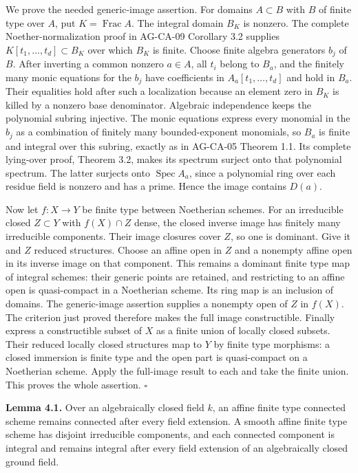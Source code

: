 \documentclass[11pt,a4paper,openany]{report}
\newcounter{none}
\begin{document}
We prove the needed generic-image assertion. For domains \(A\subset B\) with \(B\) of finite type over \(A\), put \(K=\operatorname{Frac}A\). The integral domain \(B_K\) is nonzero. The complete Noether-normalization proof in AG-CA-09 Corollary 3.2 supplies \(K[t_1,\ldots,t_d]\subset B_K\) over which \(B_K\) is finite. Choose finite algebra generators \(b_j\) of \(B\). After inverting a common nonzero \(a\in A\), all \(t_i\) belong to \(B_a\), and the finitely many monic equations for the \(b_j\) have coefficients in \(A_a[t_1,\ldots,t_d]\) and hold in \(B_a\). Their equalities hold after such a localization because an element zero in \(B_K\) is killed by a nonzero base denominator. Algebraic independence keeps the polynomial subring injective. The monic equations express every monomial in the \(b_j\) as a combination of finitely many bounded-exponent monomials, so \(B_a\) is finite and integral over this subring, exactly as in AG-CA-05 Theorem 1.1. Its complete lying-over proof, Theorem 3.2, makes its spectrum surject onto that polynomial spectrum. The latter surjects onto \(\operatorname{Spec}A_a\), since a polynomial ring over each residue field is nonzero and has a prime. Hence the image contains \(D(a)\).

Now let \(f:X\to Y\) be finite type between Noetherian schemes. For an irreducible closed \(Z\subset Y\) with \(f(X)\cap Z\) dense, the closed inverse image has finitely many irreducible components. Their image closures cover \(Z\), so one is dominant. Give it and \(Z\) reduced structures. Choose an affine open in \(Z\) and a nonempty affine open in its inverse image on that component. This remains a dominant finite type map of integral schemes: their generic points are retained, and restricting to an affine open is quasi-compact in a Noetherian scheme. Its ring map is an inclusion of domains. The generic-image assertion supplies a nonempty open of \(Z\) in \(f(X)\). The criterion just proved therefore makes the full image constructible. Finally express a constructible subset of \(X\) as a finite union of locally closed subsets. Their reduced locally closed structures map to \(Y\) by finite type morphisms: a closed immersion is finite type and the open part is quasi-compact on a Noetherian scheme. Apply the full-image result to each and take the finite union. This proves the whole assertion. \(\square\)

\textbf{Lemma 4.1.} Over an algebraically closed field \(k\), an affine finite type connected scheme remains connected after every field extension. A smooth affine finite type scheme has disjoint irreducible components, and each connected component is integral and remains integral after every field extension of an algebraically closed ground field.
\end{document}
